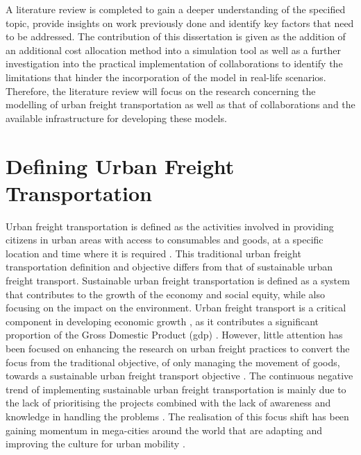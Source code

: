 \label{chapter2}
A literature review is completed to gain a deeper understanding of the specified topic, provide insights on work previously done and identify key factors that need to be addressed. The contribution of this dissertation is given as the addition of an additional cost allocation method into a simulation tool as well as a further investigation into the practical implementation of collaborations to identify the limitations that hinder the incorporation of the model in real-life scenarios. Therefore, the literature review will focus on the research concerning the modelling of urban freight transportation as well as that of collaborations and the available infrastructure for developing these models.

\section{Defining Urban Freight Transportation}
Urban freight transportation is defined as the activities involved in providing citizens in urban areas with access to consumables and goods, at a specific location and time where it is required \citep{sonke2008the}. This traditional urban freight transportation definition and objective differs from that of sustainable urban freight transport. Sustainable urban freight transportation is defined as a system that contributes to the growth of the economy and social equity, while also focusing on the impact on the environment. Urban freight transport is a critical component in developing economic growth \citep{lindholm2012challenges}, as it contributes a significant proportion of the Gross Domestic Product (\acrshort{gdp}) \citep{makamo2015road}. However, little attention has been focused on enhancing the research on urban freight practices to convert the focus from the traditional objective, of only managing the movement of goods, towards a sustainable urban freight transport objective \citep{sonke2008the}. The continuous negative trend of implementing sustainable urban freight transportation is mainly due to the lack of prioritising the projects combined with the lack of awareness and knowledge in handling the problems \citep{behrends2008impact}.
The realisation of this focus shift has been gaining momentum in mega-cities around the world that are adapting and improving the culture for urban mobility \citep{lindholm2012challenges}.\par

